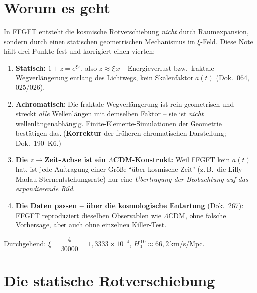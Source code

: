 
\section*{Worum es geht}

In FFGFT entsteht die kosmische Rotverschiebung \emph{nicht} durch Raumexpansion,
sondern durch einen statischen geometrischen Mechanismus im $\xi$-Feld. Diese Note
hält drei Punkte fest und korrigiert einen vierten:

\begin{enumerate}
  \item \textbf{Statisch:} $1+z = e^{\xi x}$, also $z \approx \xi\,x$ -- Energieverlust
        bzw.\ fraktale Wegverlängerung entlang des Lichtwegs, kein Skalenfaktor $a(t)$
        (Dok.~064, 025/026).
  \item \textbf{Achromatisch:} Die fraktale Wegverlängerung ist rein geometrisch und
        streckt \emph{alle} Wellenlängen mit demselben Faktor -- sie ist
        \emph{nicht} wellenlängenabhängig. Finite-Elemente-Simulationen der Geometrie
        bestätigen das. (\textbf{Korrektur} der früheren chromatischen Darstellung;
        Dok.~190~K6.)
  \item \textbf{Die $z\to$Zeit-Achse ist ein $\Lambda$CDM-Konstrukt:} Weil FFGFT kein
        $a(t)$ hat, ist jede Auftragung einer Größe \enquote{über kosmische Zeit}
        (z.\,B.\ die Lilly--Madau-Sternentstehungsrate) nur eine \emph{Übertragung
        der Beobachtung auf das expandierende Bild}.
  \item \textbf{Die Daten passen -- über die kosmologische Entartung} (Dok.~267):
        FFGFT reproduziert dieselben Observablen wie $\Lambda$CDM, ohne falsche
        Vorhersage, aber auch ohne einzelnen Killer-Test.
\end{enumerate}

\medskip
Durchgehend: $\xi = \dfrac{4}{30000} = 1{,}3333\times10^{-4}$,
$H_0^{\text{T0}} \approx 66{,}2$\,km/s/Mpc.

\section{Die statische Rotverschiebung}

